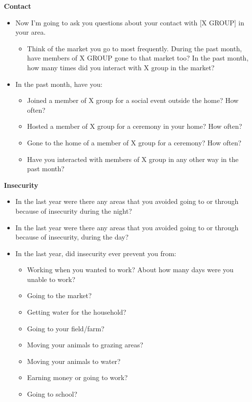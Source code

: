 \documentclass[
]{article}
\providecommand{\tightlist}{%
  \setlength{\itemsep}{0pt}\setlength{\parskip}{0pt}}
\begin{document}
\textbf{Contact}

\begin{itemize}
\tightlist
\item
  Now I'm going to ask you questions about your contact with {[}X
  GROUP{]} in your area.

  \begin{itemize}
  \tightlist
  \item
    Think of the market you go to most frequently. During the past
    month, have members of X GROUP gone to that market too? In the past
    month, how many times did you interact with X group in the market?
  \end{itemize}
\item
  In the past month, have you:

  \begin{itemize}
  \tightlist
  \item
    Joined a member of X group for a social event outside the home? How
    often?
  \item
    Hosted a member of X group for a ceremony in your home? How often?
  \item
    Gone to the home of a member of X group for a ceremony? How often?
  \item
    Have you interacted with members of X group in any other way in the
    past month?
  \end{itemize}
\end{itemize}

\textbf{Insecurity}

\begin{itemize}
\tightlist
\item
  In the last year were there any areas that you avoided going to or
  through because of insecurity during the night?
\item
  In the last year were there any areas that you avoided going to or
  through because of insecurity, during the day?
\item
  In the last year, did insecurity ever prevent you from:

  \begin{itemize}
  \tightlist
  \item
    Working when you wanted to work? About how many days were you unable
    to work?
  \item
    Going to the market?
  \item
    Getting water for the household?
  \item
    Going to your field/farm?
  \item
    Moving your animals to grazing areas?
  \item
    Moving your animals to water?
  \item
    Earning money or going to work?
  \item
    Going to school?
  \end{itemize}
\end{itemize}
\end{document}
